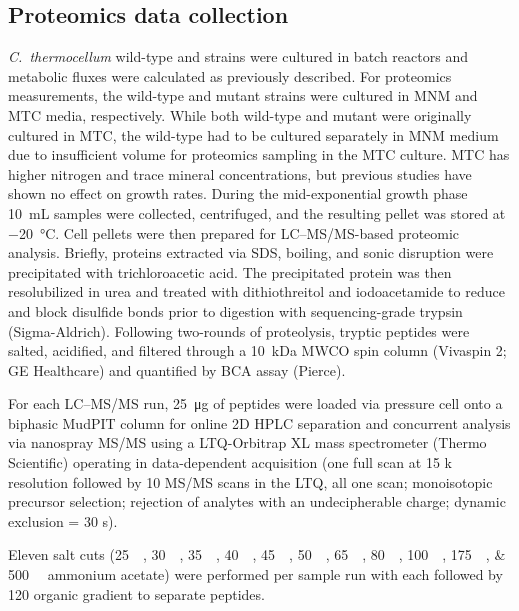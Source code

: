 \subsection{Proteomics data collection}
\textit{C.~thermocellum} wild-type and  strains were cultured in batch reactors and metabolic fluxes were calculated as previously described.\citep{thompson2015}
For proteomics measurements, the wild-type and mutant strains were cultured in MNM and MTC media,\citep{kridelbaugh2013} respectively. While both wild-type and mutant were originally cultured in MTC,\citep{thompson2015} the wild-type had to be cultured separately in MNM medium due to insufficient volume for proteomics sampling in the MTC culture.
MTC has higher nitrogen and trace mineral concentrations, but previous studies have shown no effect on growth rates.\citep{kridelbaugh2013}
During the mid-exponential growth phase \SI{10}{\milli\liter} samples were collected, centrifuged, and the resulting pellet was stored at \SI{-20}{\celsius}. Cell pellets were then prepared for LC–MS/MS-based proteomic analysis.
Briefly, proteins extracted via SDS, boiling, and sonic disruption were precipitated with trichloroacetic acid.\citep{giannone2015}
The precipitated protein was then resolubilized in urea and treated with dithiothreitol and iodoacetamide to reduce and block disulfide bonds prior to digestion with sequencing-grade trypsin (Sigma-Aldrich).
Following two-rounds of proteolysis, tryptic peptides were salted, acidified, and filtered through a \SI{10}{\kilo\dalton} MWCO spin column (Vivaspin 2; GE Healthcare) and quantified by BCA assay (Pierce).

For each LC–MS/MS run, \SI{25}{\micro\gram} of peptides were loaded via pressure cell onto a biphasic MudPIT column for online 2D HPLC separation and concurrent analysis via nanospray MS/MS using a LTQ-Orbitrap XL mass spectrometer (Thermo Scientific) operating in data-dependent acquisition (one full scan at 15 k resolution followed by 10 MS/MS scans in the LTQ, all one \si{\micro}scan; monoisotopic precursor selection; rejection of analytes with an undecipherable charge; dynamic exclusion = 30 s).\citep{giannone2015a}

Eleven salt cuts (\SIlist{25;30;35;40;45;50;65;80;100;175;500}{\milli\molar} ammonium acetate) were performed per sample run with each followed by \SI{120}{\min} organic gradient to separate peptides.

